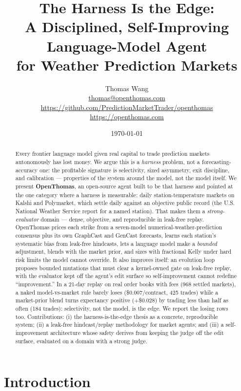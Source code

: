 \documentclass[10pt,twocolumn]{article}
\title{\textbf{The Harness Is the Edge:\\ A Disciplined, Self-Improving Language-Model Agent\\ for Weather Prediction Markets}}
\author{Thomas Wang\\ \small \href{mailto:thomas@openthomas.com}{thomas@openthomas.com}\\ \small \url{https://github.com/PredictionMarketTrader/openthomas} \quad\textbullet\quad \url{https://openthomas.com}}
\date{\today}
\begin{document}
\maketitle

\begin{abstract}
Every frontier language model given real capital to trade prediction markets
autonomously has lost money. We argue this is a \emph{harness} problem, not a
forecasting-accuracy one: the profitable signature is selectivity, sized
asymmetry, exit discipline, and calibration --- properties of the system around
the model, not the model itself. We present \textbf{OpenThomas}, an open-source
agent built to be that harness and pointed at the one category where a harness is
measurable: daily station-temperature markets on Kalshi and Polymarket, which
settle daily against an objective public record (the U.S. National Weather
Service report for a named station). That makes them a \emph{strong-evaluator}
domain --- dense, objective, and reproducible in leak-free replay. OpenThomas
prices each strike from a seven-model numerical-weather-prediction consensus plus
its own GraphCast and GenCast forecasts, learns each station's systematic bias
from leak-free hindcasts, lets a language model make a \emph{bounded} adjustment,
blends with the market prior, and sizes with fractional Kelly under hard risk
limits the model cannot override. It also improves itself: an evolution loop
proposes bounded mutations that must clear a kernel-owned gate on leak-free
replay, with the evaluator kept off the agent's edit surface so self-improvement
cannot redefine ``improvement.'' In a 21-day replay on real order books with fees
(968 settled markets), a naked model-vs-market rule barely loses
(\$0.007/contract, 425 trades) while a market-prior blend turns expectancy
positive ($+$\$0.028) by trading less than half as often (184 trades):
selectivity, not the model, is the edge. We report the losing rows too.
Contributions: (i) the harness-is-the-edge thesis as a concrete, reproducible
system; (ii) a leak-free hindcast/replay methodology for market agents; and (iii)
a self-improvement architecture whose safety derives from keeping the judge off
the edit surface, evaluated on a domain with a strong judge.
\end{abstract}

\section{Introduction}
\end{document}
